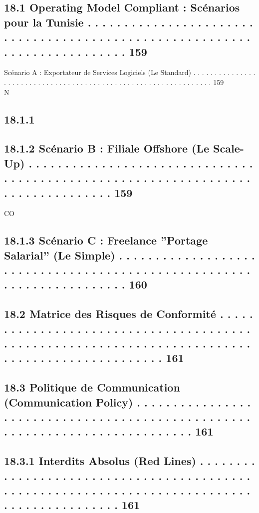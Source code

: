 \documentclass[12pt,landscape,a4paper]{article}
\begin{document}
\subsection{18.1    Operating Model Compliant : Scénarios pour la Tunisie . . . . . . . . . . . . . . . . . . . . . . . . . . . . . . . . . . . . . . . . . . . . . . . . . . . . . . . . . . . . . . . . . . . . . . . . . . 159}
Scénario A : Exportateur de Services Logiciels (Le Standard) . . . . . . . . . . . . . . . . . . . . . . . . . . . . . . . . . . . . . . . . . . . . . . . . . . . . . . . . . . . . . . . . 159\\
\vspace{0.5em}
N\\
\subsection{18.1.1}
\subsection{18.1.2            Scénario B : Filiale Offshore (Le Scale-Up) . . . . . . . . . . . . . . . . . . . . . . . . . . . . . . . . . . . . . . . . . . . . . . . . . . . . . . . . . . . . . . . . . . . . . . . . . . . . . . . . 159}
CO\\
\subsection{18.1.3            Scénario C : Freelance ”Portage Salarial” (Le Simple) . . . . . . . . . . . . . . . . . . . . . . . . . . . . . . . . . . . . . . . . . . . . . . . . . . . . . . . . . . . . . . . . . . . . . . 160}
\subsection{18.2    Matrice des Risques de Conformité . . . . . . . . . . . . . . . . . . . . . . . . . . . . . . . . . . . . . . . . . . . . . . . . . . . . . . . . . . . . . . . . . . . . . . . . . . . . . . . . . . . . . . . . . . . . . . . 161}
\subsection{18.3    Politique de Communication (Communication Policy) . . . . . . . . . . . . . . . . . . . . . . . . . . . . . . . . . . . . . . . . . . . . . . . . . . . . . . . . . . . . . . . . . . . . . . . . . . . . 161}
\subsection{18.3.1            Interdits Absolus (Red Lines) . . . . . . . . . . . . . . . . . . . . . . . . . . . . . . . . . . . . . . . . . . . . . . . . . . . . . . . . . . . . . . . . . . . . . . . . . . . . . . . . . . . . . . . . . . . . 161}
\end{document}
